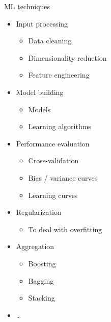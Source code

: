 \documentclass[aspectratio=169, xcolor=dvipsnames]{beamer}
\begin{document}
  \begin{frame}{ML techniques}
    \begin{itemize}
      \item Input processing
        \begin{itemize}
          \item Data cleaning

          \item Dimensionality reduction

          \item Feature engineering
        \end{itemize}

      \item Model building
        \begin{itemize}
          \item Models

          \item Learning algorithms
        \end{itemize}

      \item Performance evaluation
        \begin{itemize}
          \item Cross-validation

          \item Bias / variance curves

          \item Learning curves
        \end{itemize}

      \item Regularization
        \begin{itemize}
          \item To deal with overfitting
        \end{itemize}

      \item Aggregation
        \begin{itemize}
          \item Boosting

          \item Bagging

          \item Stacking
        \end{itemize}

      \item \ldots{}
    \end{itemize}
  \end{frame}
\end{document}
